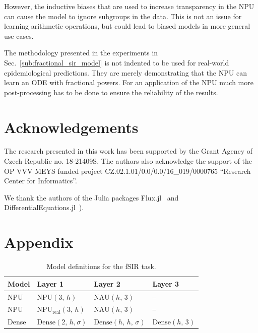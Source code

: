 \documentclass[9pt]{article}
\newcommand{\npu}{\text{NPU}}
\newcommand{\nau}{\text{NAU}}
\newcommand{\dense}{\text{Dense}}
\begin{document}
However, the inductive biases that are used to increase transparency in the NPU
can cause the model to ignore subgroups in the data. This is not an issue for learning
arithmetic operations, but could lead to biased models in more general use cases.

The methodology presented in the experiments in Sec.~\ref{sub:fractional_sir_model}
is not indented to be used for real-world epidemiological predictions.
They are merely demonstrating that the NPU can learn an ODE with fractional powers.
For an application of the NPU much more post-processing has to be done to ensure
the reliability of the results.




\section{Acknowledgements}%
\label{sec:acknowledgements}

The research presented in this work has been supported by the Grant Agency of
Czech Republic no. 18-21409S. The authors also acknowledge the support of the
OP VVV MEYS funded project CZ.02.1.01/0.0/0.0/16\_019/0000765 ``Research Center
for Informatics''.

We thank the authors of the Julia packages
Flux.jl~\citep{innes_fashionable_2018} and
DifferentialEquations.jl~\citep{rackauckas_differentialequationsjl_2017}).




\newpage
\appendix
\section*{Appendix}%
\label{sec:appendix}

\setcounter{table}{0}
\renewcommand{\thetable}{A\arabic{table}}

\begin{table}[h]
  \centering
  \caption{Model definitions for the fSIR task.}
  \label{tab:fsir_models}
  \begin{tabular}{llll}
    \toprule
    Model & Layer 1 & Layer 2 & Layer 3 \\
    \midrule
    NPU & $\npu(3,\,h)$ & $\nau(h,\,3)$ & -- \\
    NPU & NPU$_{\text{real}}(3,\,h)$ & $\nau(h,\,3)$ & -- \\
    Dense & $\dense(2,\,h,\sigma)$ & $\dense(h,\,h,\,\sigma)$ & $\dense(h,\,3)$ \\
    \bottomrule
  \end{tabular}
\end{table}
\end{document}
